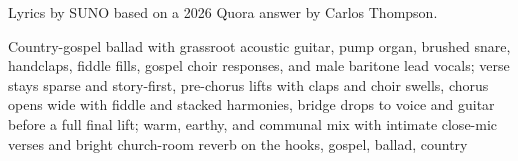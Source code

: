 
\begin{notes}
Lyrics by SUNO based on a 2026 Quora answer by Carlos Thompson.
\end{notes}
\begin{style}
Country-gospel ballad with grassroot acoustic guitar, pump organ, brushed snare, handclaps, fiddle fills, gospel choir responses, and male baritone lead vocals; verse stays sparse and story-first, pre-chorus lifts with claps and choir swells, chorus opens wide with fiddle and stacked harmonies, bridge drops to voice and guitar before a full final lift; warm, earthy, and communal mix with intimate close-mic verses and bright church-room reverb on the hooks, gospel, ballad, country
\end{style}
